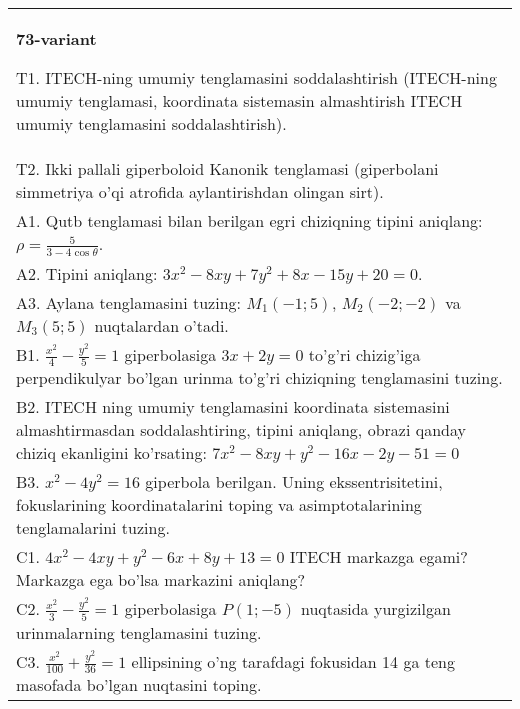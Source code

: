 \documentclass{article}
\begin{document}
\begin{tabular}{m{17cm}}
\textbf{73-variant}
\newline

T1. ITECH-ning umumiy tenglamasini soddalashtirish (ITECH-ning umumiy tenglamasi, koordinata sistemasin almashtirish ITECH umumiy tenglamasini soddalashtirish).\\

T2. Ikki pallali giperboloid Kanonik tenglamasi (giperbolani simmetriya o'qi atrofida aylantirishdan olingan sirt).\\

A1. Qutb tenglamasi bilan berilgan egri chiziqning tipini aniqlang: $\rho=\frac{5}{3-4\cos\theta}$.\\

A2. Tipini aniqlang: $3x^{2}-8xy+7y^{2}+8x-15y+20=0$.\\

A3. Aylana tenglamasini tuzing: $M_1(-1;5)$, $M_2(-2;-2)$ va $M_3(5;5)$ nuqtalardan o'tadi.\\

B1. $\frac{x^{2}}{4} - \frac{y^{2}}{5} = 1$ giperbolasiga $3x + 2y = 0$ to'g'ri chizig'iga perpendikulyar bo'lgan urinma to'g'ri chiziqning tenglamasini tuzing.\\

B2. ITECH ning umumiy tenglamasini koordinata sistemasini almashtirmasdan soddalashtiring, tipini aniqlang, obrazi qanday chiziq ekanligini ko'rsating: $7x^{2} - 8xy + y^{2} - 16x - 2y - 51 = 0$\\

B3. $x^{2} - 4y^{2} = 16$ giperbola berilgan. Uning ekssentrisitetini, fokuslarining koordinatalarini toping va asimptotalarining tenglamalarini tuzing.\\

C1. $4x^{2} - 4xy + y^{2} - 6x + 8y + 13 = 0$ ITECH markazga egami? Markazga ega bo'lsa markazini aniqlang?  \\

C2. $\frac{x^{2}}{3} - \frac{y^{2}}{5} = 1$ giperbolasiga $P(1; - 5)$ nuqtasida yurgizilgan urinmalarning tenglamasini tuzing.\\

C3. $\frac{x^{2}}{100} + \frac{y^{2}}{36} = 1$ ellipsining o'ng tarafdagi fokusidan 14 ga teng masofada bo'lgan nuqtasini toping.  \\

\end{tabular}
\vspace{1cm}
\end{document}
